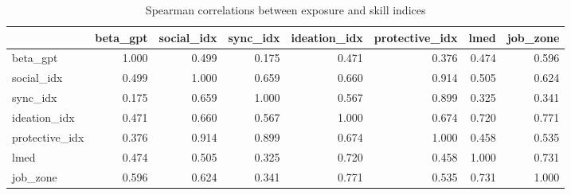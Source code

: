 \begin{table}
\caption{Spearman correlations between exposure and skill indices}
\label{tab:table_s1_exposure_skill_correlations}
\begin{tabular}{lrrrrrrr}
\toprule
 & beta\_gpt & social\_idx & sync\_idx & ideation\_idx & protective\_idx & lmed & job\_zone \\
\midrule
beta\_gpt & 1.000 & 0.499 & 0.175 & 0.471 & 0.376 & 0.474 & 0.596 \\
social\_idx & 0.499 & 1.000 & 0.659 & 0.660 & 0.914 & 0.505 & 0.624 \\
sync\_idx & 0.175 & 0.659 & 1.000 & 0.567 & 0.899 & 0.325 & 0.341 \\
ideation\_idx & 0.471 & 0.660 & 0.567 & 1.000 & 0.674 & 0.720 & 0.771 \\
protective\_idx & 0.376 & 0.914 & 0.899 & 0.674 & 1.000 & 0.458 & 0.535 \\
lmed & 0.474 & 0.505 & 0.325 & 0.720 & 0.458 & 1.000 & 0.731 \\
job\_zone & 0.596 & 0.624 & 0.341 & 0.771 & 0.535 & 0.731 & 1.000 \\
\bottomrule
\end{tabular}
\end{table}
